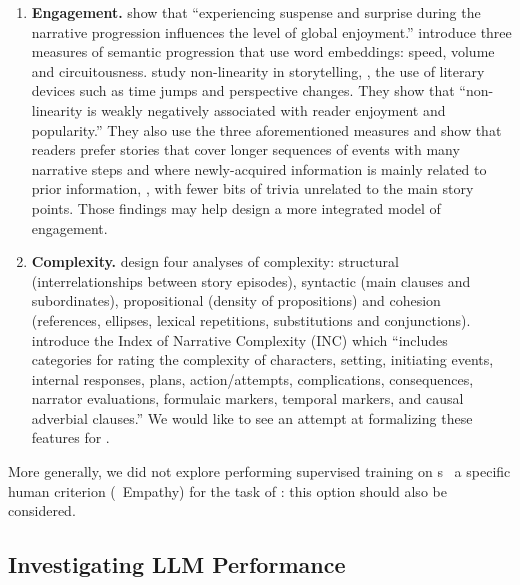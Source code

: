 \begin{enumerate}
    \item \textbf{Engagement.} \citet{bermejo2022inducing} show that ``experiencing suspense and surprise during the narrative progression influences the level of global enjoyment.'' \citet{toubia2021quantifying} introduce three measures of semantic progression that use word embeddings: speed, volume and circuitousness. \citet{piper2023quantitative} study non-linearity in storytelling, {\ie}, the use of literary devices such as time jumps and perspective changes. They show that ``non-linearity is weakly negatively associated with reader enjoyment and popularity.'' They also use the three aforementioned measures and show that readers prefer stories that cover longer sequences of events with many narrative steps and where newly-acquired information is mainly related to prior information, {\ie}, with fewer bits of trivia unrelated to the main story points. Those findings may help design a more integrated model of engagement.
    \item \textbf{Complexity.} \citet{kemper1990telling} design four analyses of complexity: structural (interrelationships between story episodes), syntactic (main clauses and subordinates), propositional (density of propositions) and cohesion (references, ellipses, lexical repetitions, substitutions and conjunctions). \citet{petersen2008emerging} introduce the Index of Narrative Complexity (INC) which ``includes categories for rating the complexity of characters, setting, initiating events, internal responses, plans, action/attempts, complications, consequences, narrator evaluations, formulaic markers, temporal markers, and causal adverbial clauses.'' We would like to see an attempt at formalizing these features for {\ase}.
\end{enumerate}
More generally, we did not explore performing supervised training on {\llmfull}s {\wrt}\ a specific human criterion ({\eg}\ Empathy) for the task of {\ase}: this option should also be considered.

\subsection{Investigating LLM Performance}
\label{sub:llm_discussion}

